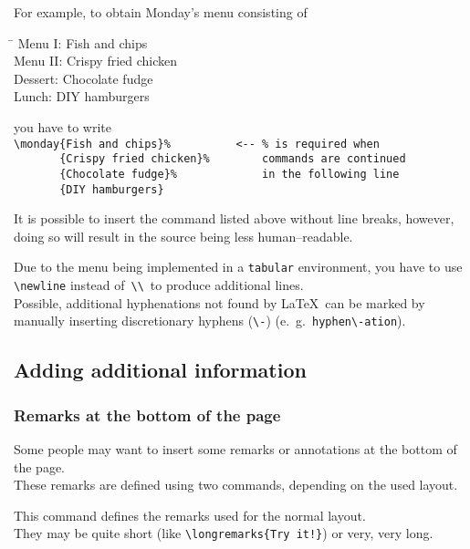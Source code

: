 \documentclass[11pt]{ltxdoc}
\begin{document}
	For example, to obtain Monday's menu consisting of
	\begin{multicols}{2}
		\begin{tabbing}
			\hspace{2cm}\=\kill
			Menu I:		\> Fish and chips \\
			Menu II:	\> Crispy fried chicken \\
			Dessert:	\> Chocolate fudge \\
			Lunch:		\> DIY hamburgers
		\end{tabbing}
	\end{multicols}
	you have to write \\
	\verb|\monday{Fish and chips}%          <-- % is required when| \\\nopagebreak[4]
	\verb|       {Crispy fried chicken}%        commands are continued| \\\nopagebreak[4]
	\verb|       {Chocolate fudge}%             in the following line| \\\nopagebreak[4]
	\verb|       {DIY hamburgers}|
	
	\smallskip
	It is possible to insert the command listed above without line breaks, however, doing so will result in the source being less human--readable.
	
	\smallskip
	Due to the menu being implemented in a \texttt{tabular} environment, you have to use \verb|\newline| instead of \,\verb|\\|\, to produce additional lines. \\
	Possible, additional hyphenations not found by \LaTeX\ can be marked by manually inserting discretionary hyphens (\verb|\-|) (e.~g.~\verb|hyphen\-ation|).
	
	
	\subsection{Adding additional information}
	\subsubsection{Remarks at the bottom of the page} \label{sec:remarks}
	Some people may want to insert some remarks or annotations at the bottom of the page. \\
	These remarks are defined using two commands, depending on the used layout.
	
	\medskip
	\DescribeMacro{\longremarks}
	This command defines the remarks used for the normal layout. \\
	They may be quite short (like \verb|\longremarks{Try it!}|) or very, very long.
	
\end{document}
